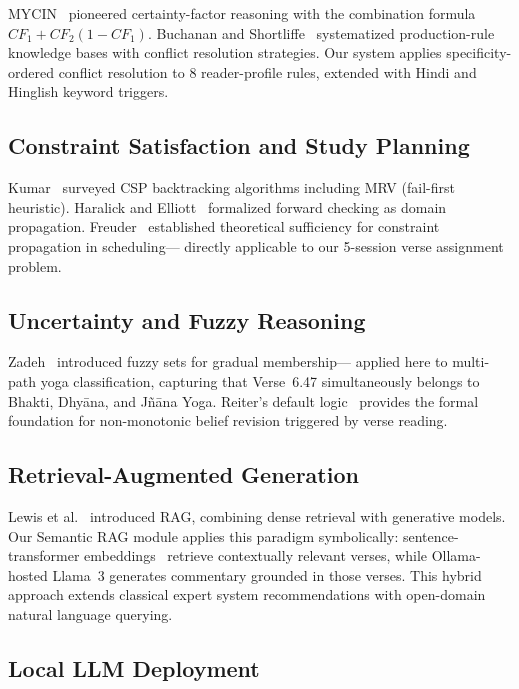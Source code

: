 \documentclass[conference]{IEEEtran}
\begin{document}
MYCIN~\cite{shortliffe1976computer} pioneered certainty-factor reasoning with
the combination formula $CF_1 + CF_2(1-CF_1)$. Buchanan and
Shortliffe~\cite{buchanan1984rule} systematized production-rule knowledge bases
with conflict resolution strategies. Our system applies specificity-ordered
conflict resolution to 8 reader-profile rules, extended with Hindi and
Hinglish keyword triggers.

\subsection{Constraint Satisfaction and Study Planning}

Kumar~\cite{kumar1992algorithms} surveyed CSP backtracking algorithms including
MRV (fail-first heuristic). Haralick and Elliott~\cite{haralick1980increasing}
formalized forward checking as domain propagation. Freuder~\cite{freuder1982sufficient}
established theoretical sufficiency for constraint propagation in scheduling—
directly applicable to our 5-session verse assignment problem.

\subsection{Uncertainty and Fuzzy Reasoning}

Zadeh~\cite{zadeh1965fuzzy} introduced fuzzy sets for gradual membership—
applied here to multi-path yoga classification, capturing that Verse~6.47
simultaneously belongs to Bhakti, Dhy\={a}na, and J\~{n}\={a}na Yoga.
Reiter's default logic~\cite{reiter1980logic} provides the formal foundation
for non-monotonic belief revision triggered by verse reading.

\subsection{Retrieval-Augmented Generation}

Lewis et al.~\cite{lewis2020rag} introduced RAG, combining dense retrieval
with generative models. Our Semantic RAG module applies this paradigm
symbolically: sentence-transformer embeddings~\cite{reimers2019sentencebert}
retrieve contextually relevant verses, while Ollama-hosted Llama~3 generates
commentary grounded in those verses. This hybrid approach extends classical
expert system recommendations with open-domain natural language querying.

\subsection{Local LLM Deployment}
\end{document}
